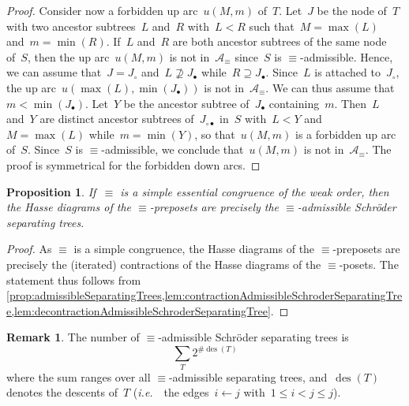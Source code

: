 \documentclass{amsart}
\newtheorem{proposition}[theorem]{Proposition}
\theoremstyle{definition}
\newtheorem{remark}[theorem]{Remark}
\DeclareMathOperator{\des}{des} %
\newcommand{\ie}{\textit{i.e.}~} %
\newcommand{\arcs}{{\mathcal{A}}} %
\begin{document}
\begin{proof}
Consider now a forbidden up arc~$u(M,m)$ of~$T$.
Let~$J$ be the node of~$T$ with two ancestor subtrees~$L$ and~$R$ with~$L < R$ such that~$M = \max(L)$ and~$m = \min(R)$.
If~$L$ and~$R$ are both ancestor subtrees of the same node of~$S$, then the up arc~$u(M,m)$ is not in~$\arcs_\equiv$ since~$S$ is \mbox{$\equiv$-admissible}.
Hence, we can assume that~$J = J_\circ$ and~$L \not\supseteq J_\bullet$ while~$R \supseteq J_\bullet$.
Since~$L$ is attached to~$J_\circ$, the up arc~$u(\max(L), \min(J_\bullet))$ is not in~$\arcs_\equiv$.
We can thus assume that~$m < \min(J_\bullet)$.
Let~$Y$ be the ancestor subtree of~$J_\bullet$ containing~$m$.
Then~$L$ and~$Y$ are distinct ancestor subtrees of~$J_{\circ\bullet}$ in~$S$ with~$L < Y$ and~$M = \max(L)$ while~$m = \min(Y)$, so that~$u(M,m)$ is a forbidden up arc of~$S$.
Since~$S$ is $\equiv$-admissible, we conclude that~$u(M,m)$ is not in~$\arcs_\equiv$.
The proof is symmetrical for the forbidden down arcs.
\end{proof}


\begin{proposition}
\label{prop:admissibleSchroderSeparatingTrees}
If~$\equiv$ is a simple essential congruence of the weak order, then the Hasse diagrams of the $\equiv$-preposets are precisely the $\equiv$-admissible Schröder separating trees.
\end{proposition}

\begin{proof}
As $\equiv$ is a simple congruence, the Hasse diagrams of the $\equiv$-preposets are precisely the (iterated) contractions of the Hasse diagrams of the $\equiv$-posets.
The statement thus follows from \cref{prop:admissibleSeparatingTrees,lem:contractionAdmissibleSchroderSeparatingTree,lem:decontractionAdmissibleSchroderSeparatingTree}.
\end{proof}

\begin{remark}
The number of $\equiv$-admissible Schröder separating trees is
\[
\sum_T 2^{\#\des(T)}
\]
where the sum ranges over all $\equiv$-admissible separating trees, and~$\des(T)$ denotes the descents of~$T$ (\ie~the edges~$i \leftarrow j$ with~$1 \le i < j \le j$).
\end{remark}
\end{document}
